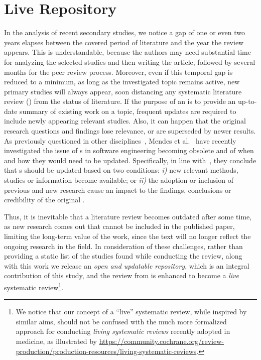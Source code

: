 \chapter{Live Repository}\label{chap:live}

In the analysis of recent secondary studies, we notice a gap of one or even two years elapses between the covered period of literature and the year the review appears. 
This is understandable, because the authors may need substantial time for analyzing the selected studies and then writing the article, followed by several months for the peer review process. 
Moreover, even if this temporal gap is reduced to a minimum, as long as the investigated topic remains active, new primary studies will always appear, soon distancing any systematic literature review (\slr) from the status of literature.  
If the purpose of an \slr is to provide an up-to-date summary of existing work on a topic, frequent updates are required to include newly appearing relevant studies.
Also, it can happen that the original research questions and findings lose relevance, or are superseded by newer results.
As previously questioned in other disciplines~\cite{Garneri3507}, Mendes et al.~\cite{MENDES2020110607} have recently investigated the issue of {\slr}s in software engineering becoming obsolete and of when and how they would need to be updated. 
Specifically, in line with~\cite{Garneri3507}, they conclude that {\slr}s should be updated based on two conditions: \textit{i)} new relevant methods, studies or information become available; or \textit{ii)} the adoption or inclusion of previous and new research cause an impact to the findings, conclusions or credibility of the original \slr.

Thus, it is inevitable that a literature review becomes outdated after some time, as new research comes out that cannot be included in the published paper, limiting the long-term value of the work, since the text will no longer reflect the ongoing research in the field.
In consideration of these challenges, rather than providing a static list of the studies found while conducting the review, along with this work we release an \textit{open and updatable repository}, which is an integral contribution of this study, and
the review from  is enhanced to become a \textit{live} systematic review\footnote{We notice that our concept of a ``live'' systematic review, while inspired by similar aims, should not be confused with the much more formalized approach for conducting \textit{living systematic reviews} recently adopted in medicine, as illustrated by \url{https://community.cochrane.org/review-production/production-resources/living-systematic-reviews}.}. 

